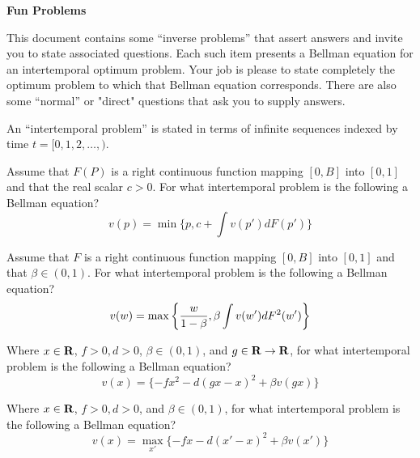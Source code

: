

\paper

\overfullrule=0pt
\def\frac#1#2{#1\over #2}
%
\def\bmatrix#1{\left[ \matrix{#1} \right]}
\def\be{{\beta}}
\def\toone{{t+1}}

\overfullrule=0pt


\centerline{\bf  Fun Problems}


\medskip

 This document contains some ``inverse problems'' that assert answers and invite you to state  associated questions.
 Each such item presents a Bellman equation for an intertemporal  optimum problem.  Your job is please to
state completely the optimum problem to which that Bellman equation corresponds.  There are also some 
``normal'' or "direct" questions that ask you to supply answers.

\medskip
{} An ``intertemporal problem'' is stated in terms of  infinite sequences indexed by time $t = [0, 1, 2, \ldots, )$.



\medskip

Assume that  $F(P)$ is a right continuous function mapping $[0, B]$ into $[0,1]$ and that the real scalar $c > 0$.  For what intertemporal problem is the following
a Bellman equation?
$$ v(p) = \min \{p, c + \int v(p') d F(p') \}$$

\medskip



  Assume that  $F$ is a right continuous function mapping $[0, B]$ into $[0,1]$ and that $\beta \in (0,1)$. For what intertemporal problem is the following a Bellman equation?
$$ v(w) = \max\left\{ {w\over{1-\beta}},  \beta \int v(w') d F^2(w') \right\} $$



\medskip
{} Where $x \in {\bf R}$, $f >0, d >0 $,   $\beta \in (0,1)$, and $g \in  {\bf R} \rightarrow {\bf R}$, for what intertemporal problem is the following  a Bellman equation?
$$ v(x) =  \{- f x^2 - d(gx  - x)^2 + \beta v(gx) \} $$


\medskip
{}   Where $x \in {\bf R}$, $f >0, d >0 $, and   $\beta \in (0,1)$, for what intertemporal problem is the following  a Bellman equation?
$$ v(x) = \max_{x'} \{ - f x - d(x' - x)^2 + \beta v(x') \} $$


